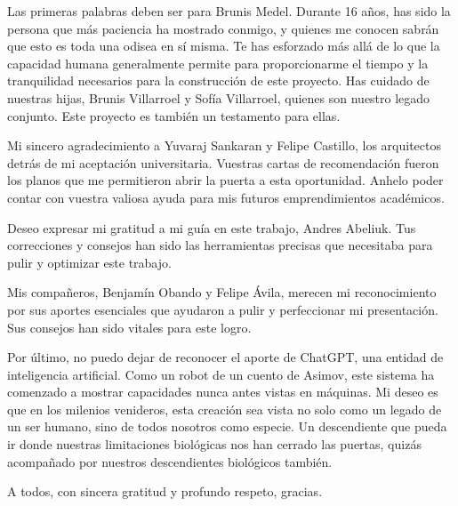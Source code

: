 \begin{thanks} %
Las primeras palabras deben ser para Brunis Medel. Durante 16 años, has sido la persona que más paciencia ha mostrado conmigo, y quienes me conocen sabrán que esto es toda una odisea en sí misma. Te has esforzado más allá de lo que la capacidad humana generalmente permite para proporcionarme el tiempo y la tranquilidad necesarios para la construcción de este proyecto. Has cuidado de nuestras hijas, Brunis Villarroel y Sofía Villarroel, quienes son nuestro legado conjunto. Este proyecto es también un testamento para ellas.

Mi sincero agradecimiento a Yuvaraj Sankaran y Felipe Castillo, los arquitectos detrás de mi aceptación universitaria. Vuestras cartas de recomendación fueron los planos que me permitieron abrir la puerta a esta oportunidad. Anhelo poder contar con vuestra valiosa ayuda para mis futuros emprendimientos académicos.

Deseo expresar mi gratitud a mi guía en este trabajo, Andres Abeliuk. Tus correcciones y consejos han sido las herramientas precisas que necesitaba para pulir y optimizar este trabajo.

Mis compañeros, Benjamín Obando y Felipe Ávila, merecen mi reconocimiento por sus aportes esenciales que ayudaron a pulir y perfeccionar mi presentación. Sus consejos han sido vitales para este logro.

Por último, no puedo dejar de reconocer el aporte de ChatGPT, una entidad de inteligencia artificial. Como un robot de un cuento de Asimov, este sistema ha comenzado a mostrar capacidades nunca antes vistas en máquinas. Mi deseo es que en los milenios venideros, esta creación sea vista no solo como un legado de un ser humano, sino de todos nosotros como especie. Un descendiente que pueda ir donde nuestras limitaciones biológicas nos han cerrado las puertas, quizás acompañado por nuestros descendientes biológicos también.

A todos, con sincera gratitud y profundo respeto, gracias.
\end{thanks}